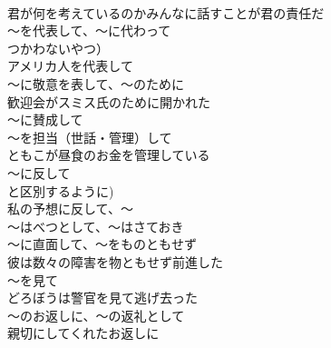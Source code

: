 \documentclass[8pt]{extreport}
\begin{document}
\begin{CJK}{UTF8}{min}
\\	君が何を考えているのかみんなに話すことが君の責任だ
\\	～を代表して、～に代わって
\\	つかわないやつ）	
\\	アメリカ人を代表して
\\	～に敬意を表して、～のために	
\\	歓迎会がスミス氏のために開かれた
\\	～に賛成して	
\\	～を担当（世話・管理）して	
\\	ともこが昼食のお金を管理している
\\	～に反して
\\	と区別するように)	
\\	私の予想に反して、～
\\	～はべつとして、～はさておき	
\\	～に直面して、～をものともせず	
\\	彼は数々の障害を物ともせず前進した
\\	～を見て	
\\	どろぼうは警官を見て逃げ去った
\\	～のお返しに、～の返礼として	
\\	親切にしてくれたお返しに
\end{CJK}
\end{document}
